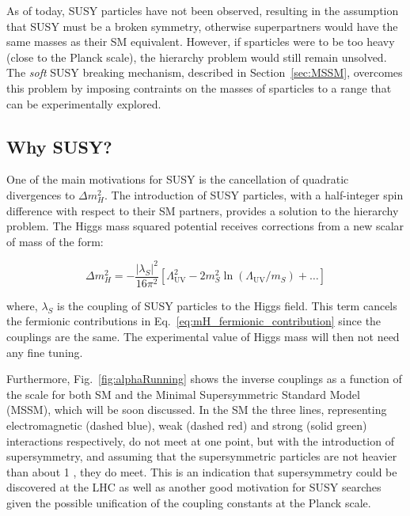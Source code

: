 		As of today, SUSY particles have not been observed, resulting in the assumption that SUSY must be a broken symmetry, otherwise superpartners would have the same masses as their SM equivalent. However, if sparticles were to be too heavy (close to the Planck scale), the hierarchy problem would still remain unsolved. The \emph{soft} SUSY breaking mechanism, described in Section~\ref{sec:MSSM}, overcomes this problem by imposing contraints on the masses of sparticles to a range that can be experimentally explored. 		

		

		\subsection{Why SUSY?}
		\label{sec:whySUSY}			

			One of the main motivations for SUSY is the cancellation of quadratic divergences to $\Delta m_H^2$. 
			The introduction of SUSY particles, with a half-integer spin difference with respect to their SM partners, provides a solution to the hierarchy problem. The Higgs mass squared potential receives corrections from a new scalar of mass of the form:

			\begin{equation}
			\label{eq:mH_scalar_contribution}
			\Delta m_H^2 = - \frac{\left | \lambda_S \right |^2}{16 \pi ^2} \left [  \Lambda_{\mathrm{UV}}^2 - 2m_S^2 \ln \left (\Lambda_{\mathrm{UV}} / m_S \right) + \dots \right ]
			\end{equation}

			\noindent where, $\lambda_S$ is the coupling of SUSY particles to the Higgs field. This term cancels the fermionic contributions in Eq.~\ref{eq:mH_fermionic_contribution} since the couplings are the same. The experimental value of Higgs mass will then not need any fine tuning.

			Furthermore, Fig.~\ref{fig:alphaRunning} shows the inverse couplings as a function of the scale for both SM and the Minimal Supersymmetric Standard Model (MSSM), which will be soon discussed. In the SM the three lines, representing electromagnetic (dashed blue), weak (dashed red) and strong (solid green) interactions respectively, do not meet at one point, but with the introduction of supersymmetry, and assuming that the supersymmetric particles are not heavier than about 1 \TeV, they do meet. This is an indication that supersymmetry could be discovered at the LHC as well as another good motivation for SUSY searches given the possible unification of the coupling constants at the Planck scale. 

